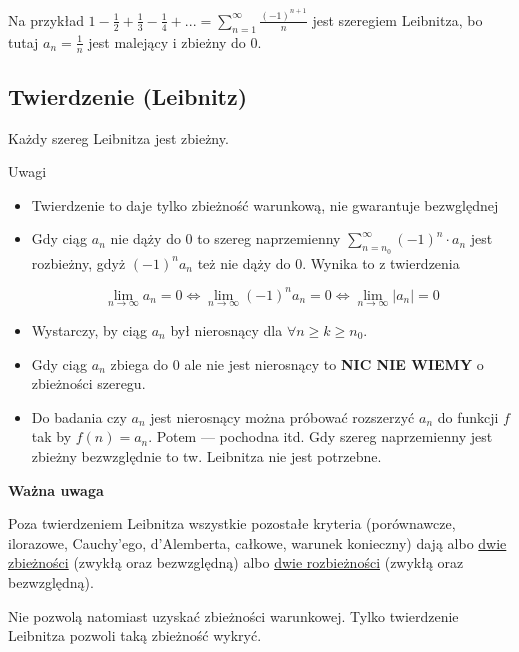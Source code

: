 Na przykład $ 1 - \frac{1}{2} + \frac{1}{3} - \frac{1}{4} + ... = \sum\limits_{n=1}^{\infty} \frac{(-1)^{n+1}}{n} $
jest szeregiem Leibnitza, bo tutaj $ a_n = \frac{1}{n} $ jest malejący i zbieżny do 0. \\

\begin{tw}{\subsection*{Twierdzenie (Leibnitz)}}

Każdy szereg Leibnitza jest zbieżny.
\end{tw}

Uwagi

\begin{itemize}
    \item Twierdzenie to daje tylko zbieżność warunkową, nie gwarantuje bezwględnej
    \item Gdy ciąg $a_n$ nie dąży do 0 to szereg naprzemienny $ \sum\limits_{n = n_0}^{\infty} (-1)^n \cdot a_n $ jest
    rozbieżny, gdyż $(-1)^n a_n$ też nie dąży do 0. Wynika to z twierdzenia

    $$ \lim_{n \to \infty} a_n = 0 \Leftrightarrow \lim_{n \to \infty} (-1)^n a_n = 0 \Leftrightarrow \lim_{n \to \infty} |a_n| = 0$$

    \item Wystarczy, by ciąg $a_n$ był nierosnący dla $ \forall n \geq k \geq n_0$.
    \item Gdy ciąg $a_n$ zbiega do 0 ale nie jest nierosnący to \textbf{NIC NIE WIEMY} o zbieżności szeregu.
    \item Do badania czy $a_n$ jest nierosnący można próbować rozszerzyć $a_n$ do funkcji $f$ tak by $f(n) = a_n$.
    Potem --- pochodna itd.
    Gdy szereg naprzemienny jest zbieżny bezwzględnie to tw. Leibnitza nie jest potrzebne. \\
\end{itemize}

\textbf{Ważna uwaga}

Poza twierdzeniem Leibnitza wszystkie pozostałe kryteria (porównawcze, ilorazowe, Cauchy'ego, d'Alemberta, całkowe, warunek konieczny) dają
albo \underline{dwie zbieżności} (zwykłą oraz bezwzględną) albo \underline{dwie rozbieżności} (zwykłą oraz bezwzględną).

Nie pozwolą natomiast uzyskać zbieżności warunkowej. Tylko twierdzenie Leibnitza pozwoli taką zbieżność wykryć.
\medskip

